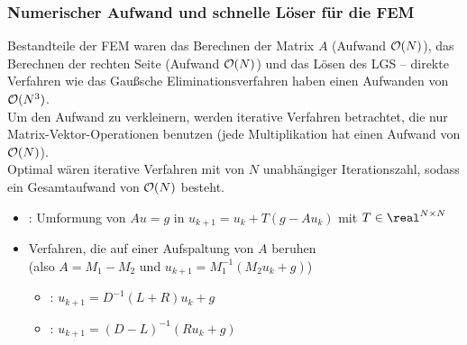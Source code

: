 \pagebreak

\subsubsection{%
    Numerischer Aufwand und schnelle Löser für die FEM%
}

\begin{Bem}
    Bestandteile der FEM waren
    das Berechnen der Matrix $A$ (Aufwand $\mathcal{O}(N)$),
    das Berechnen der rechten Seite (Aufwand $\mathcal{O}(N)$) und
    das Lösen des LGS --
    direkte Verfahren wie das Gaußsche Eliminationsverfahren
    haben einen Aufwanden von $\mathcal{O}(N^3)$.\\
    Um den Aufwand zu verkleinern,
    werden iterative Verfahren betrachtet, die nur
    Matrix-Vektor-Operationen benutzen
    (jede Multiplikation hat einen Aufwand von $\mathcal{O}(N)$).\\
    Optimal wären iterative Verfahren mit von $N$ unabhängiger Iterationszahl,
    sodass ein Gesamtaufwand von $\mathcal{O}(N)$ besteht.
    \begin{itemize}
        \item
        :
        Umformung von $Au = g$ in
        $u_{k+1} = u_k + T(g - Au_k)$ mit $T \in \real^{N \times N}$

        \item
        Verfahren, die auf einer Aufspaltung von $A$ beruhen\\
        (also $A = M_1 - M_2$ und $u_{k+1} = M_1^{-1} (M_2 u_k + g)$)
        \begin{itemize}
            \item
            :
            $u_{k+1} = D^{-1} (L + R) u_k + g$

            \item
            :
            $u_{k+1} = (D - L)^{-1} (Ru_k + g)$
        \end{itemize}


\end{itemize}
\end{Bem}

